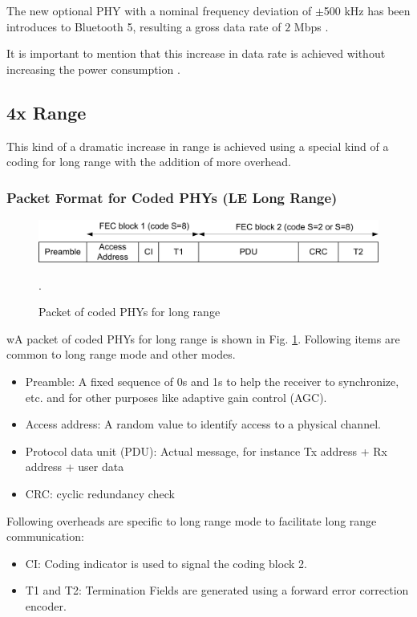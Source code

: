\documentclass[journal, a4paper]{IEEEtran}
\begin{document}
The new optional PHY with a nominal frequency deviation of $\pm$500 kHz has been introduces to Bluetooth 5, resulting a gross data rate of $2$ Mbps \cite{SCHULZ}.

It is important to mention that this increase in data rate is achieved without increasing the power consumption \cite{MOUSER}.

\subsection{4x Range}

This kind of a dramatic increase in range is achieved using a special kind of a coding for long range with the addition of more overhead. 

\subsubsection{Packet Format for Coded PHYs (LE Long Range)}

\begin{figure}[!hbt]
		\begin{center}
		\includegraphics [width=.4\textwidth]{packet_of_coded_PHYs.png}
		\caption{Packet of coded PHYs for long range }.
		\label{fig:packet}
		\end{center}
\end{figure}

wA packet of coded PHYs for long range is shown in Fig. \ref{fig:packet}. Following items are common to long range mode and other modes.
\begin{itemize}
\item Preamble: A fixed sequence of 0s and 1s to help the receiver to synchronize, etc. and for other purposes like adaptive gain control (AGC).
\item Access address: A random value to identify access to a physical channel.
\item Protocol data unit (PDU): Actual message, for instance Tx address + Rx address + user data
\item CRC: cyclic redundancy check
\end{itemize}

Following overheads are specific to long range mode to facilitate long range communication:

\begin{itemize}
\item CI: Coding indicator is used to signal the coding block 2.
\item T1 and T2: Termination Fields are generated using a forward error correction encoder.
\end{itemize}
\end{document}
